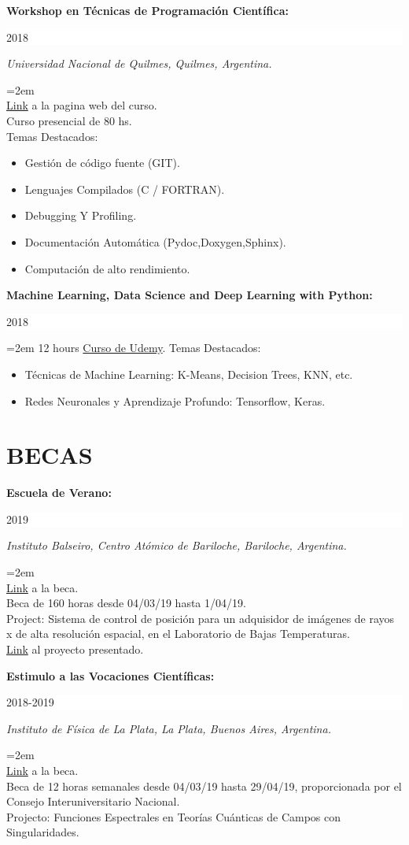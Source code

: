 \documentclass[paper=letter,fontsize=11pt]{scrartcl} %
\newcommand{\sepspace}{\vspace*{1em}}		%
\newcommand{\NewPart}[2]{\section*{\uppercase{#1} \small \normalfont #2}}
\newcommand{\EducationEntry}[4]{
		\noindent \textbf{#1} \hfill      %
		\colorbox{White}{%
			\parbox{6em}{%
			\hfill\color{Black}#2}} \par  %
		\noindent \textit{#3} \par        %
		\noindent\hangindent=2em\hangafter=0 \small #4 %
		\normalsize \par}
\begin{document}
\EducationEntry{Workshop en Técnicas de Programación Científica:
}{2018}{Universidad Nacional de Quilmes, Quilmes, Argentina.}{\\
{\href{https://wtpc.github.io/}{Link}} a la pagina web del curso.\\
Curso presencial de 80 hs.\\
Temas Destacados:



\begin{itemize}
	\item{Gestión de código fuente (GIT).}
	\item{Lenguajes Compilados (C / FORTRAN).}
	\item{Debugging Y Profiling.}
	\item{Documentación Automática (Pydoc,Doxygen,Sphinx).}
	\item{Computación de alto rendimiento.}
	\end{itemize}}
\sepspace

\EducationEntry{Machine Learning, Data Science and Deep Learning with Python:
}{2018}{}{
12 hours {\href{https://www.udemy.com/data-science-and-machine-learning-with-python-hands-on/}{Curso de Udemy}}.
Temas Destacados:

\begin{itemize}
\item{Técnicas de Machine Learning: K-Means, Decision Trees, KNN, etc. }
\item{Redes Neuronales y Aprendizaje Profundo: Tensorflow, Keras.}
\end{itemize}
}


\sepspace

\NewPart{Becas}{}

\EducationEntry{Escuela de Verano:}
{2019}
{Instituto Balseiro, Centro Atómico de Bariloche, Bariloche, Argentina.}{\\
{\href{http://www.ib.edu.ar/component/k2/item/452-becas-de-verano.html}{Link}} a la beca.
\\ Beca de 160 horas desde 04/03/19 hasta 1/04/19. \\ 
Project: Sistema de control de posición para un adquisidor de imágenes de rayos x de alta resolución espacial, en el Laboratorio de Bajas Temperaturas.\\
{\href{https://drive.google.com/drive/folders/1y01BjDnIPS2QOX3Vo68r9A8HA9tstj1S}{Link}} al proyecto presentado.
}

\sepspace

\EducationEntry{Estimulo a las Vocaciones Científicas:}
{2018-2019}
{Instituto de Física de La Plata, La Plata, Buenos Aires, Argentina.}
{\\
{\href{http://evc.cin.edu.ar/}{Link}} a la beca.
\\ Beca de 12 horas semanales desde 04/03/19 hasta 29/04/19, proporcionada por el Consejo Interuniversitario Nacional. \\ 
Projecto: Funciones Espectrales en Teorías Cuánticas de Campos con Singularidades.
}
\end{document}
